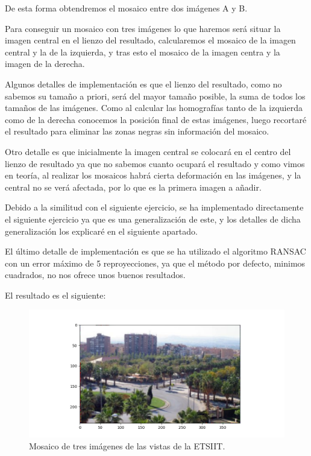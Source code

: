 \documentclass[12pt, spanish]{article}
\begin{document}
De esta forma obtendremos el mosaico entre dos imágenes A y B.

Para conseguir un mosaico con tres imágenes lo que haremos será situar la imagen central en el lienzo del resultado, calcularemos el mosaico de la imagen central y la de la izquierda, y tras esto el mosaico de la imagen centra y la imagen de la derecha.

Algunos detalles de implementación es que el lienzo del resultado, como no sabemos su tamaño a priori, será del mayor tamaño posible, la suma de todos los tamaños de las imágenes. Como al calcular las homografías tanto de la izquierda como de la derecha conocemos la posición final de estas imágenes, luego recortaré el resultado para eliminar las zonas negras sin información del mosaico.

Otro detalle es que inicialmente la imagen central se colocará en el centro del lienzo de resultado ya que no sabemos cuanto ocupará el resultado y como vimos en teoría, al realizar los mosaicos habrá cierta deformación en las imágenes, y la central no se verá afectada, por lo que es la primera imagen a añadir.

Debido a la similitud con el siguiente ejercicio, se ha implementado directamente el siguiente ejercicio ya que es una generalización de este, y los detalles de dicha generalización los explicaré en el siguiente apartado.

El último detalle de implementación es que se ha utilizado el algoritmo RANSAC con un error máximo de 5 reproyecciones, ya que el método por defecto, minimos cuadrados, no nos ofrece unos buenos resultados.


El resultado es el siguiente:


\begin{figure}[H]
  \centering
      \includegraphics[width=\textwidth]{mosaico_tres_imagenes.png}
 		\caption{Mosaico de tres imágenes de las vistas de la ETSIIT.}
\end{figure}
\end{document}
